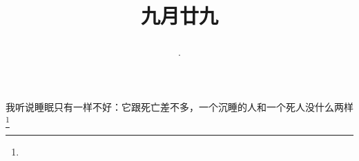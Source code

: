 \title{\date[d=31,m=10,y=2024][year:cn-y,年,month:cn,day:cn,日,·,weekday]·九月廿九 }
我听说睡眠只有一样不好：它跟死亡差不多，一个沉睡的人和一个死人没什么两样\footnote{ }

